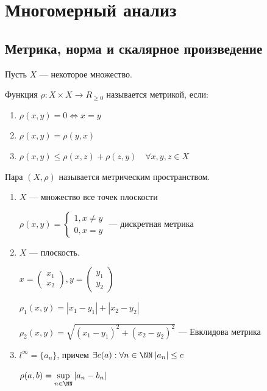 \section{Многомерный анализ}

\subsection{Метрика, норма и скалярное произведение}

\begin{defn}{}{}
    Пусть \( X \) --- некоторое множество.

    Функция \( \rho : X \times X \to R_{\geq 0} \) называется метрикой, если:
    \begin{enumerate}
        \item
            \( \rho(x, y) = 0 \Leftrightarrow x = y \)
        \item
            \( \rho(x, y) = \rho(y, x) \)
        \item
            \( \rho(x, y) \leq \rho(x, z) + \rho(z, y) \quad \forall x, y, z \in X \)
    \end{enumerate}

    Пара \( (X, \rho) \) называется метрическим пространством.
\end{defn}

\begin{example}{}{}
    \begin{enumerate}
        \item
            \( X \) --- множество все точек плоскости

            \(
                \rho(x, y)
                =
                \begin{cases}
                    1, x \neq y
                    \\
                    0, x = y
                \end{cases}
            \) --- дискретная метрика
        \item
            \( X \) --- плоскость.

            \( x = \begin{pmatrix} x_1 \\ x_2 \end{pmatrix}, y = \begin{pmatrix} y_1 \\ y_2 \end{pmatrix} \)

            \( \rho_1 (x, y) = |x_1 - y_1| + |x_2 - y_2| \)

            \( \rho_2 (x, y) = \sqrt{(x_1 - y_1)^2 + (x_2 - y_2)^2} \) --- Евклидова метрика
        \item
            \( l^\infty = \{ a_n \} \), причем \( \exists c(a) : \forall n \in \NN \: |a_n| \leq c \)

            \( \rho(a, b) = \sup\limits_{n \in \NN} |a_n - b_n| \)
    \end{enumerate}
\end{example}

